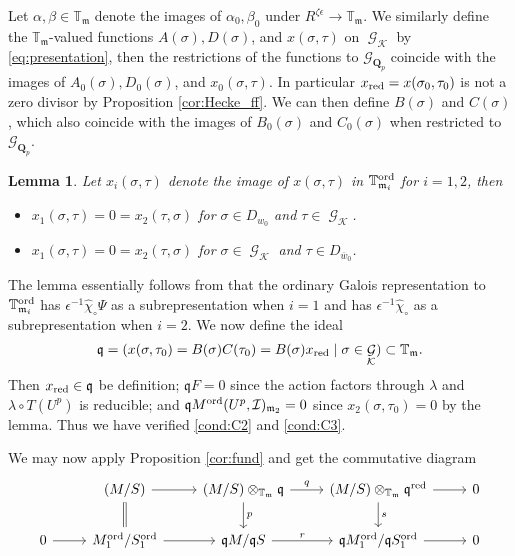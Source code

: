\documentclass[leqno]{amsart}
\newtheorem{lem}[thm]{Lemma}
\theoremstyle{definition}
\theoremstyle{remark}
\newcommand{\Qp}{\mathbf{Q}_p}
\DeclareMathOperator{\Gal}{\mathcal{G}}
\newcommand{\fm}{\mathfrak{m}}
\newcommand{\fq}{\mathfrak{q}}
\newcommand{\Gp}{\mathcal{G}_{\Qp}} %
\newcommand{\red}{\textnormal{red}}
\newcommand{\xx}{x_\textnormal{red}}
\newcommand{\K}{{\mathcal{K}}} %
\newcommand{\bw}{{\overline{w}}}
\newcommand{\TT}{\mathbb{T}} %
\newcommand{\I}{\mathcal{I}} %
\newcommand{\ord}{\textnormal{ord}} %
\begin{document}
Let $\alpha,\beta\in \TT_\fm$
denote the images of $\alpha_0,\beta_0$
under $R^{\zeta\epsilon}\to \TT_\fm$.
We similarly define the $\TT_\fm$-valued functions
$A(\sigma), D(\sigma)$, and $x(\sigma,\tau)$ on $\Gal_\K$
by \eqref{eq:presentation}, then
the restrictions of the functions to $\Gp$ coincide with the images of
$A_0(\sigma), D_0(\sigma)$, and $x_0(\sigma,\tau)$.
In particular $\xx=x(\sigma_0,\tau_0)$ is not a zero divisor
by Proposition \ref{cor:Hecke_ff}.
We can then define $B(\sigma)$ and $C(\sigma)$,
which also coincide with the images of $B_0(\sigma)$ and $C_0(\sigma)$
when restricted to $\Gp$.

\begin{lem}
Let $x_i(\sigma,\tau)$ denote the image of $x(\sigma,\tau)$ in
$\TT^{\ord}_{\fm_i}$ for $i=1,2$, then 
\begin{itemize}
    \item $x_1(\sigma,\tau)=0=x_2(\tau, \sigma)$ 
    for $\sigma\in D_{w_0}$ and $\tau\in\Gal_\K$.
    \item $x_1(\sigma,\tau)=0=x_2(\tau,\sigma)$ 
    for $\sigma\in \Gal_\K$ and $\tau\in D_{\bw_0}$.
\end{itemize}
\end{lem}
The lemma essentially follows from that 
the ordinary Galois representation to $\TT^{\ord}_{\fm_i}$
has $\epsilon^{-1}\hat{\chi}_\circ\Psi$ as a subrepresentation 
when $i=1$ and 
has $\epsilon^{-1}\hat{\chi}_\circ$ as a subrepresentation 
when $i=2$. We now define the ideal 
\[
    \fq=(x(\sigma,\tau_0)=B(\sigma)C(\tau_0)=B(\sigma)\xx
    \mid\sigma\in\Gal_\K)\subset \TT_\fm.
\]
Then $\xx\in\fq$ be definition;
$\fq F=0$ since the action factors through $\lambda$
and $\lambda\circ T(U^p)$ is reducible;
and $\fq M^{\ord}(U^p,\I)_{\fm_2}=0$
since $x_2(\sigma,\tau_0)=0$ by the lemma.
Thus we have verified \ref{cond:C2} and \ref{cond:C3}.

We may now apply Proposition \ref{cor:fund} and 
get the commutative diagram
\begin{equation*}
    \begin{tikzcd}
    & (M/S)
    \arrow[r]\arrow[d,equal] &
    (M/S)\otimes_{\TT_\fm}\fq
    \arrow[r,"q"]\arrow[d,"p"] &
    (M/S)\otimes_{\TT_\fm}\fq^\red
    \arrow[r]\arrow[d,"s"] &0\\
    0\arrow[r] &
    M^{\ord}_1/S^{\ord}_1
    \arrow[r] &
    \fq M/\fq S
    \arrow[r,"r"] &
    \fq M^{\ord}_1/\fq S^{\ord}_1
    \arrow[r] &0
    \end{tikzcd}
\end{equation*}
\end{document}
